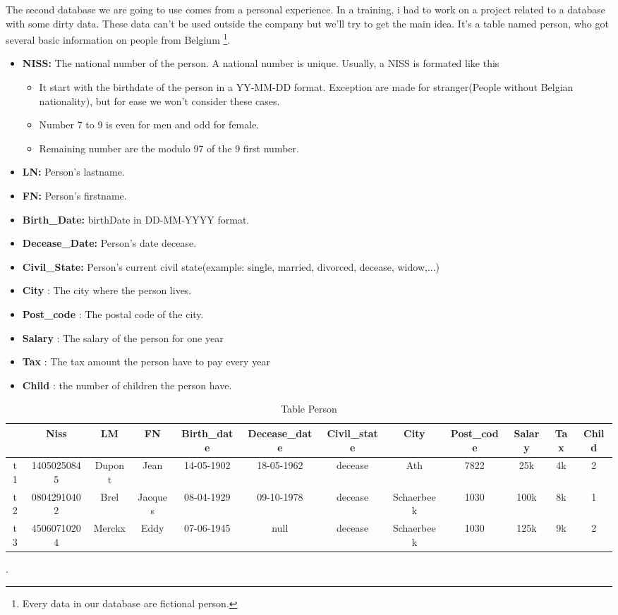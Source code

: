 \documentclass[letterpaper, 12pt]{report}
\begin{document}
The second database we are going to use comes from a personal experience. In a training, i had to work on a project related to a database with some dirty data. These data can't be used outside the company but we'll try to get the main idea. It's a table named person, who got several basic information on people from Belgium \footnote{Every data in our database are fictional person.}.
\begin{itemize}
\item \textbf{NISS:} The national number of the person. A national number is unique. Usually, a NISS is formated like this\cite{bcss}
	\begin{itemize}
	\item It start with the birthdate of the person in a YY-MM-DD format. Exception are made for stranger(People without Belgian nationality), but for ease we won't consider these cases.
	\item Number 7 to 9 is even for men and odd for female.
	\item Remaining number are the modulo 97 of the 9 first number. 
	\end{itemize}
\item \textbf{LN:} Person's lastname.
\item \textbf{FN:} Person's firstname.
\item \textbf{Birth\_Date:} birthDate in DD-MM-YYYY format.
\item \textbf{Decease\_Date:} Person's date decease.
\item \textbf{Civil\_State:} Person's current civil state(example: single, married, divorced, decease, widow,...)
\item \textbf{City} : The city where the person lives.
\item \textbf{Post\_code} : The postal code of the city.
\item \textbf{Salary} : The salary of the person for one year
\item \textbf{Tax} : The tax amount the person have to pay every year
\item \textbf{Child} : the number of children the person have.
\end{itemize}

\begin{table}[H]
 \footnotesize	
	\centering
	\hspace*{-2cm}\begin{tabular}{|c|c c c c c c c c c c c|}
	\hline
	    & Niss & LM & FN & Birth\_date & Decease\_date & Civil\_state & City & Post\_code& Salary & Tax & Child\\
	\hline
	 t1 & 14050250845 & Dupont & Jean & 14-05-1902 & 18-05-1962 & decease & Ath & 7822 & 25k & 4k & 2\\
	 t2 & 08042910402 & Brel & Jacques & 08-04-1929 & 09-10-1978 & decease & Schaerbeek & 1030 & 100k & 8k & 1\\
	 t3 & 45060710204 & Merckx & Eddy & 07-06-1945 & null & decease & Schaerbeek & 1030 & 125k & 9k & 2\\
	\hline
	 
	 \hline
	\end{tabular}
	\caption{\label{tablePerson} Table Person}.
\end{table}
\end{document}

